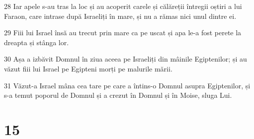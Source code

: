 \par 28 Iar apele s-au tras la loc și au acoperit carele și călăreții întregii oștiri a lui Faraon, care intrase după Israeliți în mare, și nu a rămas nici unul dintre ei.
\par 29 Fiii lui Israel însă au trecut prin mare ca pe uscat și apa le-a fost perete la dreapta și stânga lor.
\par 30 Așa a izbăvit Domnul în ziua aceea pe Israeliți din mâinile Egiptenilor; și au văzut fiii lui Israel pe Egipteni morți pe malurile mării.
\par 31 Văzut-a Israel mâna cea tare pe care a întins-o Domnul asupra Egiptenilor, și s-a temut poporul de Domnul și a crezut în Domnul și în Moise, sluga Lui.

\chapter{15}


